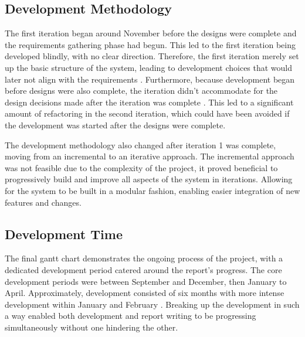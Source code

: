 \subsection{Development Methodology}
The first iteration began around November before the designs were complete and the requirements gathering phase had begun. This led to the first iteration being developed blindly, with no clear direction. Therefore, the first iteration merely set up the basic structure of the system, leading to development choices that would later not align with the requirements . Furthermore, because development began before designs were also complete, the iteration didn't accommodate for the design decisions made after the iteration was complete . This led to a significant amount of refactoring in the second iteration, which could have been avoided if the development was started after the designs were complete.

The development methodology also changed after iteration 1 was complete, moving from an incremental to an iterative approach. The incremental approach was not feasible due to the complexity of the project, it proved beneficial to progressively build and improve all aspects of the system in iterations. Allowing for the system to be built in a modular fashion, enabling easier integration of new features and changes.

\subsection{Development Time}
The final gantt chart  demonstrates the ongoing process of the project, with a dedicated development period catered around the report's progress. The core development periods were between September and December, then January to April. Approximately, development consisted of six months with more intense development within January and February . Breaking up the development in such a way enabled both development and report writing to be progressing simultaneously without one hindering the other.

